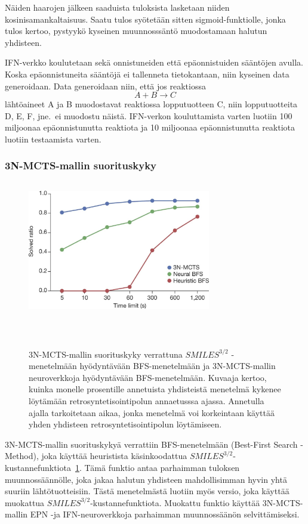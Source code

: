 \documentclass[finnish,twoside,censored,tkt,sw-line]{HYthesisML}
\begin{document}
Näiden haarojen jälkeen saaduista tuloksista lasketaan niiden kosinisamankaltaisuus.
Saatu tulos syötetään sitten sigmoid-funktiolle, jonka tulos kertoo, pystyykö kyseinen muunnosssäntö muodostamaan halutun yhdisteen.

IFN-verkko koulutetaan sekä onnistuneiden että epäonnistuiden sääntöjen avulla.
Koska epäonnistuneita sääntöjä ei tallenneta tietokantaan, niin kyseinen data generoidaan.
Data generoidaan niin, että jos reaktiossa \[A + B \rightarrow C\] lähtöaineet A ja B muodostavat reaktiossa lopputuotteen C, niin lopputuotteita D, E, F, jne.\ ei muodostu näistä.
IFN-verkon kouluttamista varten luotiin 100 miljoonaa epäonnistunutta reaktiota ja 10 miljoonaa epäonnistunutta reaktiota luotiin testaamista varten.

\subsubsection{3N-MCTS-mallin suorituskyky}

\begin{figure}[!ht]
    \centering
    \includegraphics[width=8cm, height=6cm]{3N-MCTS-performance-fig.jpg}
    \caption{
        3N-MCTS-mallin suorituskyky verrattuna \(SMILES^{3/2}\) -menetelmään hyödyntävään BFS-menetelmään ja 3N-MCTS-mallin neuroverkkoja hyödyntävään BFS-menetelmään.
        Kuvaaja kertoo, kuinka monelle prosentille annetuista yhdisteistä menetelmä kykenee löytämään retrosyntetisointipolun annaetusssa ajassa.
        Annetulla ajalla tarkoitetaan aikaa, jonka menetelmä voi korkeintaan käyttää yhden yhdisteen retrosyntetisointipolun löytämiseen.
    }
    {~\cite{SeglerMarwinHS2018Pcsw}}
    \label{fig:3n-mcts-performance}
\end{figure}

3N-MCTS-mallin suorituskykyä verrattiin BFS-menetelmään (Best-First Search -Method), joka käyttää heuristista käsinkoodattua \(SMILES^{3/2}\)-kustannefunktiota~\ref{fig:3n-mcts-performance}.
Tämä funktio antaa parhaimman tuloksen muunnossäännölle, joka jakaa halutun yhdisteen mahdollisimman hyvin yhtä suuriin lähtötuotteisiin.
Tästä menetelmästä luotiin myös versio, joka käyttää muokattua \(SMILES^{3/2}\)-kustannefunktiota.
Muokattu funktio käyttää 3N-MCTS-mallin EPN -ja IFN-neuroverkkoja parhaimman muunnossäänön selvittämiseksi.
\end{document}
